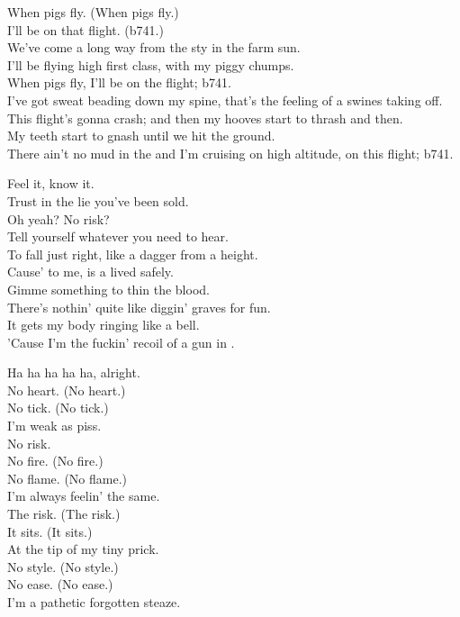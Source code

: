 When pigs fly. (When pigs fly.) \\
I'll be on that flight. (b741.) \\

We've come a long way from the sty in the farm sun. \\
I'll be flying high first class, with my piggy chumps. \\

When pigs fly, I'll be on the flight; b741. \\

I've got sweat beading down my spine, that's the feeling of a swines taking off. \\
This flight's gonna crash; and then my hooves start to thrash and then. \\
My teeth start to gnash until we hit the ground. \\
There ain't no mud in the  and I'm cruising on high altitude, on this flight; b741. \\




Feel it, know it. \\
Trust in the lie you've been sold. \\
Oh yeah? No risk? \\
Tell yourself whatever you need to hear. \\
To fall just right, like a dagger from a height. \\
Cause'  to me, is a  lived safely. \\

Gimme something to thin the blood. \\
There's nothin' quite like diggin' graves for fun. \\
It gets my body ringing like a bell. \\
'Cause I'm the fuckin' recoil of a gun in . \\


Ha ha ha ha ha, alright. \\
No heart. (No heart.) \\
No tick. (No tick.) \\
I'm weak as piss. \\
No risk. \\
No fire. (No fire.) \\
No flame. (No flame.) \\
I'm always feelin' the same. \\
The risk. (The risk.) \\
It sits. (It sits.) \\
At the tip of my tiny prick. \\
No style. (No style.) \\
No ease. (No ease.) \\
I'm a pathetic forgotten steaze. \\

